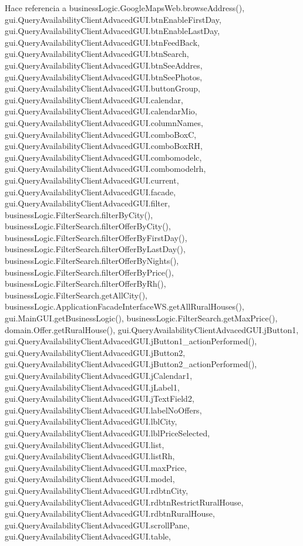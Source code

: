 Hace referencia a business\+Logic.\+Google\+Maps\+Web.\+browse\+Address(), gui.\+Query\+Availability\+Client\+Advaced\+G\+U\+I.\+btn\+Enable\+First\+Day, gui.\+Query\+Availability\+Client\+Advaced\+G\+U\+I.\+btn\+Enable\+Last\+Day, gui.\+Query\+Availability\+Client\+Advaced\+G\+U\+I.\+btn\+Feed\+Back, gui.\+Query\+Availability\+Client\+Advaced\+G\+U\+I.\+btn\+Search, gui.\+Query\+Availability\+Client\+Advaced\+G\+U\+I.\+btn\+See\+Addres, gui.\+Query\+Availability\+Client\+Advaced\+G\+U\+I.\+btn\+See\+Photos, gui.\+Query\+Availability\+Client\+Advaced\+G\+U\+I.\+button\+Group, gui.\+Query\+Availability\+Client\+Advaced\+G\+U\+I.\+calendar, gui.\+Query\+Availability\+Client\+Advaced\+G\+U\+I.\+calendar\+Mio, gui.\+Query\+Availability\+Client\+Advaced\+G\+U\+I.\+column\+Names, gui.\+Query\+Availability\+Client\+Advaced\+G\+U\+I.\+combo\+BoxC, gui.\+Query\+Availability\+Client\+Advaced\+G\+U\+I.\+combo\+Box\+RH, gui.\+Query\+Availability\+Client\+Advaced\+G\+U\+I.\+combomodelc, gui.\+Query\+Availability\+Client\+Advaced\+G\+U\+I.\+combomodelrh, gui.\+Query\+Availability\+Client\+Advaced\+G\+U\+I.\+current, gui.\+Query\+Availability\+Client\+Advaced\+G\+U\+I.\+facade, gui.\+Query\+Availability\+Client\+Advaced\+G\+U\+I.\+filter, business\+Logic.\+Filter\+Search.\+filter\+By\+City(), business\+Logic.\+Filter\+Search.\+filter\+Offer\+By\+City(), business\+Logic.\+Filter\+Search.\+filter\+Offer\+By\+First\+Day(), business\+Logic.\+Filter\+Search.\+filter\+Offer\+By\+Last\+Day(), business\+Logic.\+Filter\+Search.\+filter\+Offer\+By\+Nights(), business\+Logic.\+Filter\+Search.\+filter\+Offer\+By\+Price(), business\+Logic.\+Filter\+Search.\+filter\+Offer\+By\+Rh(), business\+Logic.\+Filter\+Search.\+get\+All\+City(), business\+Logic.\+Application\+Facade\+Interface\+W\+S.\+get\+All\+Rural\+Houses(), gui.\+Main\+G\+U\+I.\+get\+Business\+Logic(), business\+Logic.\+Filter\+Search.\+get\+Max\+Price(), domain.\+Offer.\+get\+Rural\+House(), gui.\+Query\+Availability\+Client\+Advaced\+G\+U\+I.\+j\+Button1, gui.\+Query\+Availability\+Client\+Advaced\+G\+U\+I.\+j\+Button1\+\_\+action\+Performed(), gui.\+Query\+Availability\+Client\+Advaced\+G\+U\+I.\+j\+Button2, gui.\+Query\+Availability\+Client\+Advaced\+G\+U\+I.\+j\+Button2\+\_\+action\+Performed(), gui.\+Query\+Availability\+Client\+Advaced\+G\+U\+I.\+j\+Calendar1, gui.\+Query\+Availability\+Client\+Advaced\+G\+U\+I.\+j\+Label1, gui.\+Query\+Availability\+Client\+Advaced\+G\+U\+I.\+j\+Text\+Field2, gui.\+Query\+Availability\+Client\+Advaced\+G\+U\+I.\+label\+No\+Offers, gui.\+Query\+Availability\+Client\+Advaced\+G\+U\+I.\+lbl\+City, gui.\+Query\+Availability\+Client\+Advaced\+G\+U\+I.\+lbl\+Price\+Selected, gui.\+Query\+Availability\+Client\+Advaced\+G\+U\+I.\+list, gui.\+Query\+Availability\+Client\+Advaced\+G\+U\+I.\+list\+Rh, gui.\+Query\+Availability\+Client\+Advaced\+G\+U\+I.\+max\+Price, gui.\+Query\+Availability\+Client\+Advaced\+G\+U\+I.\+model, gui.\+Query\+Availability\+Client\+Advaced\+G\+U\+I.\+rdbtn\+City, gui.\+Query\+Availability\+Client\+Advaced\+G\+U\+I.\+rdbtn\+Restrict\+Rural\+House, gui.\+Query\+Availability\+Client\+Advaced\+G\+U\+I.\+rdbtn\+Rural\+House, gui.\+Query\+Availability\+Client\+Advaced\+G\+U\+I.\+scroll\+Pane, gui.\+Query\+Availability\+Client\+Advaced\+G\+U\+I.\+table, 